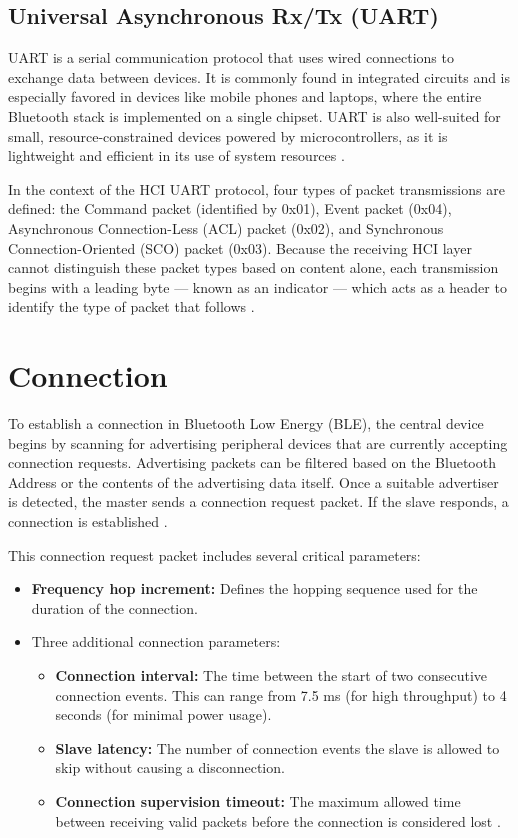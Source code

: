 \subsection{Universal Asynchronous Rx/Tx (UART)}

UART is a serial communication protocol that uses wired connections to exchange data between devices. It is commonly found in integrated circuits and is especially favored in devices like mobile phones and laptops, where the entire Bluetooth stack is implemented on a single chipset. UART is also well-suited for small, resource-constrained devices powered by microcontrollers, as it is lightweight and efficient in its use of system resources \cite{nextgenble}.

In the context of the HCI UART protocol, four types of packet transmissions are defined: the Command packet (identified by 0x01), Event packet (0x04), Asynchronous Connection-Less (ACL) packet (0x02), and Synchronous Connection-Oriented (SCO) packet (0x03). Because the receiving HCI layer cannot distinguish these packet types based on content alone, each transmission begins with a leading byte — known as an indicator — which acts as a header to identify the type of packet that follows \cite{nextgenBLE}.

\section{Connection}

To establish a connection in Bluetooth Low Energy (BLE), the central device begins by scanning for advertising peripheral devices that are currently accepting connection requests. Advertising packets can be filtered based on the Bluetooth Address or the contents of the advertising data itself. Once a suitable advertiser is detected, the master sends a connection request packet. If the slave responds, a connection is established \cite{gettingstartedwble}.

This connection request packet includes several critical parameters:
\begin{itemize}
    \item \textbf{Frequency hop increment:} Defines the hopping sequence used for the duration of the connection.
    \item Three additional connection parameters:
    \begin{itemize}
        \item \textbf{Connection interval:} The time between the start of two consecutive connection events. This can range from 7.5 ms (for high throughput) to 4 seconds (for minimal power usage).
        \item \textbf{Slave latency:} The number of connection events the slave is allowed to skip without causing a disconnection.
        \item \textbf{Connection supervision timeout:} The maximum allowed time between receiving valid packets before the connection is considered lost \cite{gettingstartedwble}.
    \end{itemize}
\end{itemize}

